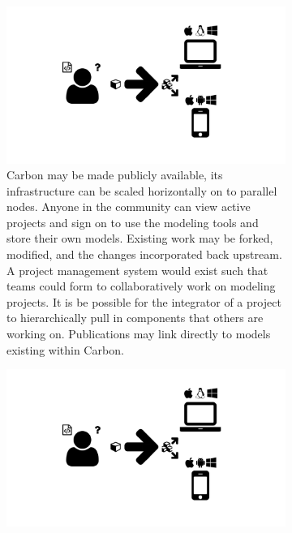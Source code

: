 \begin{figure}
  \centering
  \begin{subfigure}[b]{0.5\textwidth}
    \includegraphics[width=\textwidth, page=30, trim=0cm 0cm 14cm 7cm, clip=true]{images/Figures.pdf}
    \caption{Carbon may be made publicly available, its infrastructure can be scaled horizontally on to parallel nodes.
      Anyone in the community can view active projects and sign on to use the modeling tools and store their own models.
      Existing work may be forked, modified, and the changes incorporated back upstream.
      A project management system would exist such that teams could form to collaboratively work on modeling projects.
      It is be possible for the integrator of a project to hierarchically pull in components that others are working on.
      Publications may link directly to models existing within Carbon.}
    \label{Figure:redox-table-view}
  \end{subfigure}
  \begin{subfigure}[b]{0.45\textwidth}
    \includegraphics[width=\textwidth, page=31, trim=0cm 0cm 17cm 9cm, clip=true]{images/Figures.pdf}

\end{subfigure}
\end{figure}
